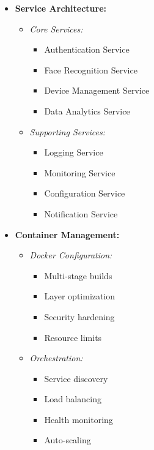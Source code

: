 \begin{itemize}
    \item \textbf{Service Architecture:}
    \begin{itemize}
        \item \textit{Core Services:}
        \begin{itemize}
            \item Authentication Service
            \item Face Recognition Service
            \item Device Management Service
            \item Data Analytics Service
        \end{itemize}
        \item \textit{Supporting Services:}
        \begin{itemize}
            \item Logging Service
            \item Monitoring Service
            \item Configuration Service
            \item Notification Service
        \end{itemize}
    \end{itemize}
    
    \item \textbf{Container Management:}
    \begin{itemize}
        \item \textit{Docker Configuration:}
        \begin{itemize}
            \item Multi-stage builds
            \item Layer optimization
            \item Security hardening
            \item Resource limits
        \end{itemize}
        \item \textit{Orchestration:}
        \begin{itemize}
            \item Service discovery
            \item Load balancing
            \item Health monitoring
            \item Auto-scaling
        \end{itemize}
    \end{itemize}
\end{itemize}

